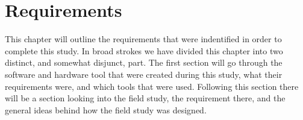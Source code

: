 \chapter{Requirements}
	This chapter will outline the requirements that were indentified in order to complete this study. 
	In broad strokes we have divided this chapter into two distinct, and somewhat disjunct, part. 
	The first section will go through the software and hardware tool that were created during this study, what their requirements were, and which tools that were used.
	Following this section there will be a section looking into the field study, the requirement there, and the general ideas behind how the field study was designed.		
	


